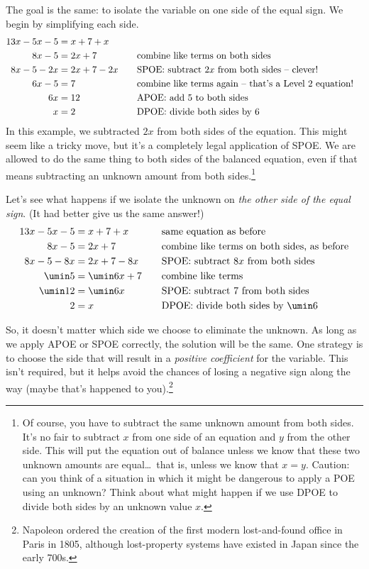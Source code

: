 The goal is the same: to isolate the variable on one side of the equal sign. We begin by simplifying each side.
\[\begin{aligned}
13x-5x-5 &= x+7+x\\
8x-5 &= 2x+7
&&\text{\quad combine like terms on both sides}\\
8x-5 - 2x &= 2x+7 - 2x
&&\text{\quad SPOE: subtract $2x$ from both sides -- clever!}\\
6x-5 &= 7
&&\text{\quad combine like terms again -- that's a Level 2 equation!}\\
6x &= 12
&&\text{\quad APOE: add 5 to both sides}\\
x &= 2
&&\text{\quad DPOE: divide both sides by 6}
\end{aligned}\]
In this example, we subtracted $2x$ from both sides of the equation. This might seem like a tricky move, but it's a completely legal application of SPOE. We are allowed to do the same thing to both sides of the balanced equation, even if that means subtracting an unknown amount from both sides.\footnote{Of course, you have to subtract the same unknown amount from both sides. It's no fair to subtract $x$ from one side of an equation and $y$ from the other side. This will put the equation out of balance unless we know that these two unknown amounts are equal\ldots\ that is, unless we know that $x=y$. Caution: can you think of a situation in which it might be dangerous to apply a POE using an unknown? Think about what might happen if we use DPOE to divide both sides by an unknown value $x$.}

Let's see what happens if we isolate the unknown on \textit{the other side of the equal sign}. (It had better give us the same answer!)
\[\begin{aligned}
13x-5x-5 &= x+7+x
&&\text{\quad same equation as before}\\
8x-5 &= 2x+7
&&\text{\quad combine like terms on both sides, as before}\\
8x-5 - 8x &= 2x+7 - 8x
&&\text{\quad SPOE: subtract $8x$ from both sides}\\
\umin5 &= \umin6x + 7
&&\text{\quad combine like terms}\\
\umin12 &= \umin6x
&&\text{\quad SPOE: subtract 7 from both sides}\\
2 &= x
&&\text{\quad DPOE: divide both sides by $\umin6$}
\end{aligned}\]

So, it doesn't matter which side we choose to eliminate the unknown. As long as we apply APOE or SPOE correctly, the solution will be the same. One strategy is to choose the side that will result in a \textit{positive coefficient} for the variable. This isn't required, but it helps avoid the chances of losing a negative sign along the way (maybe that's happened to you).\footnote{Napoleon ordered the creation of the first modern lost-and-found office in Paris in 1805, although lost-property systems have existed in Japan since the early 700s.}

